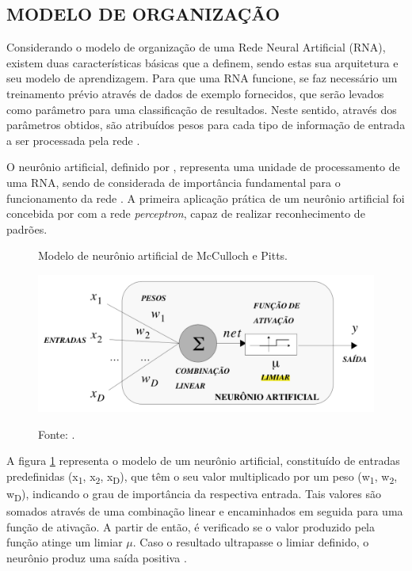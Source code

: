 \subsection{MODELO DE ORGANIZAÇÃO}

Considerando o modelo de organização de uma Rede Neural Artificial (RNA), existem duas características básicas que a definem, sendo estas sua arquitetura e seu modelo de aprendizagem. Para que uma RNA funcione, se faz necessário um treinamento prévio através de dados de exemplo fornecidos, que serão levados como parâmetro para uma classificação de resultados. Neste sentido, através dos parâmetros obtidos, são atribuídos pesos para cada tipo de informação de entrada a ser processada pela rede \cite{thomas2019}.

O neurônio artificial, definido por , representa uma unidade de processamento de uma RNA, sendo de considerada de importância fundamental para o funcionamento da rede \cite{haykin2007redes}. A primeira aplicação prática de um neurônio artificial foi concebida por  com a rede \textit{perceptron}, capaz de realizar reconhecimento de padrões.

\begin{figure}[h]
	\caption{Modelo de neurônio artificial de McCulloch e Pitts.}
	\centering %
	\includegraphics[width=14cm]{resources/modelo_neuronio.png} %
	\label{figura:modelo_neuronio}	
	\caption*{Fonte: .}
\end{figure}

A figura \ref{figura:modelo_neuronio} representa o modelo de um neurônio artificial, constituído de entradas predefinidas (x\textsubscript{1}, x\textsubscript{2}, x\textsubscript{D}), que têm o seu valor multiplicado por um peso (w\textsubscript{1}, w\textsubscript{2}, w\textsubscript{D}), indicando o grau de importância da respectiva entrada. Tais valores são somados através de uma combinação linear e encaminhados em seguida para uma função de ativação. A partir de então, é verificado se o valor produzido pela função atinge um limiar \(\mu\). Caso o resultado ultrapasse o limiar definido, o neurônio produz uma saída positiva \cite{thomas2019}.

